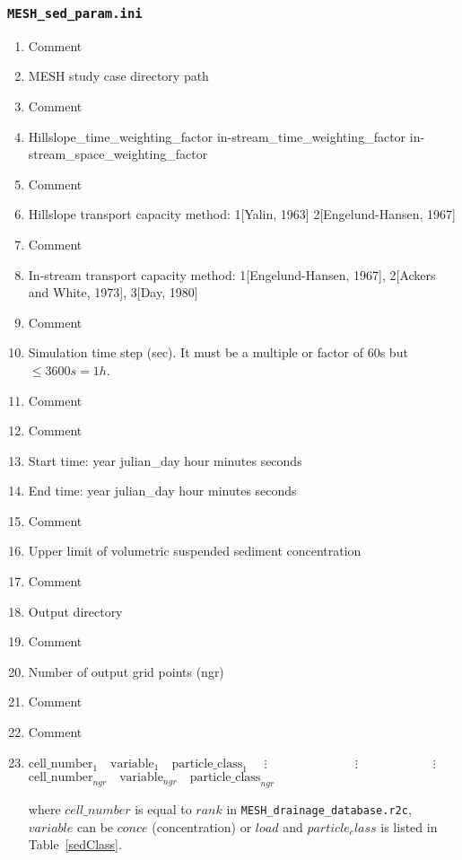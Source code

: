 \documentclass{beamer}
\newcounter{ResumeEnumerate}
\begin{document}
\begin{frame} \frametitle{\texttt{MESH\_sed\_param.ini}}
{\tiny
\begin{enumerate}[label=Line \arabic*]\itemsep0em 
\item Comment
\item MESH study case directory path
\item Comment
\item Hillslope\_time\_weighting\_factor	in-stream\_time\_weighting\_factor	in-stream\_space\_weighting\_factor
\item Comment
\item Hillslope transport capacity method: 1[Yalin, 1963]\cite{yalin1963expression} 2[Engelund-Hansen, 1967]\cite{engelund1967monograph}
\item Comment
\item In-stream transport capacity method: 1[Engelund-Hansen, 1967]\cite{engelund1967monograph}, 2[Ackers and White, 1973]\cite{ackers1973sediment}, 3[Day, 1980]\cite{}
\item Comment
\item Simulation time step (sec). It must be a multiple or factor of 60s but $\le 3600 s = 1 h$.
\item Comment
\item Comment
\item Start time: year julian\_day hour minutes seconds
\item End time: year julian\_day hour minutes seconds
\item Comment
\item Upper limit of volumetric suspended sediment concentration
\item Comment
\item Output directory
\item Comment
\item Number of output grid points (ngr)
\item Comment
\item Comment
\item 
\parbox{\textwidth}{
$\text{cell\_number}_1 \quad \text{variable}_1 \quad \text{particle\_class}_1$ \newline
$\quad \vdots \quad\quad\quad\quad\quad\quad\quad  \vdots \quad\quad\quad\quad\quad\quad \vdots$ \newline
$\text{cell\_number}_{ngr} \quad \text{variable}_{ngr} \quad \text{particle\_class}_{ngr} $

}
where $cell\_number$ is equal to $rank$ in \texttt{MESH\_drainage\_database.r2c}, $variable$ can be $conce$ (concentration) or $load$ and $particle_class$ is listed in Table~\ref{sedClass}.
\end{enumerate}
\setcounter{ResumeEnumerate}{\value{enumi}}
}
\end{frame}
\end{document}
